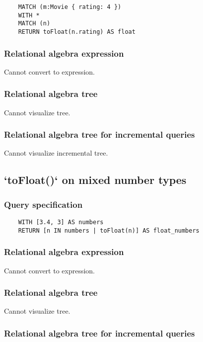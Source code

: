 	\begin{lstlisting}
	MATCH (m:Movie { rating: 4 })
	WITH *
	MATCH (n)
	RETURN toFloat(n.rating) AS float
	\end{lstlisting}


	\subsubsection*{Relational algebra expression}

	Cannot convert to expression.

	\subsubsection*{Relational algebra tree}

	Cannot visualize tree.

	\subsubsection*{Relational algebra tree for incremental queries}

	Cannot visualize incremental tree.
	\subsection{`toFloat()` on mixed number types}

	\subsubsection*{Query specification}

	\begin{lstlisting}
	WITH [3.4, 3] AS numbers
	RETURN [n IN numbers | toFloat(n)] AS float_numbers
	\end{lstlisting}


	\subsubsection*{Relational algebra expression}

	Cannot convert to expression.

	\subsubsection*{Relational algebra tree}

	Cannot visualize tree.

	\subsubsection*{Relational algebra tree for incremental queries}

